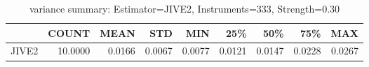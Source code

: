 \begin{table}[ht]
\centering
\caption{variance summary: Estimator=JIVE2, Instruments=333, Strength=0.30}
\begin{tabular}{lrrrrrrrr}
\toprule
 & COUNT & MEAN & STD & MIN & 25\% & 50\% & 75\% & MAX \\
\midrule
JIVE2 & 10.0000 & 0.0166 & 0.0067 & 0.0077 & 0.0121 & 0.0147 & 0.0228 & 0.0267 \\
\bottomrule
\end{tabular}
\end{table}
